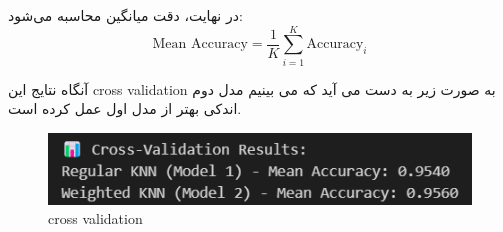 \documentclass{article}
\begin{document}
در نهایت، دقت میانگین محاسبه می‌شود:
\[
\text{Mean Accuracy} = \frac{1}{K} \sum_{i=1}^{K} \text{Accuracy}_i
\]


آنگاه نتایج این cross validation به صورت زیر به دست می آید که می بینیم مدل دوم اندکی بهتر از مدل اول عمل کرده است.
\begin{figure}[h!]
	\centering
	\includegraphics[width=0.7\linewidth]{17}
	\caption[]{cross validation}
	\label{fig:17}
\end{figure}
\clearpage
\end{document}
